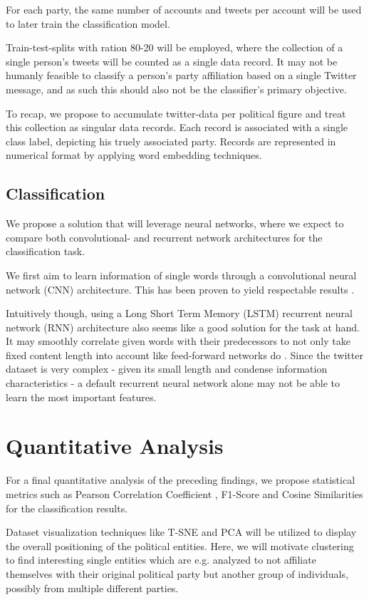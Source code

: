 \documentclass[10pt, oneside]{article}
\begin{document}
\begin{multicols}{2}
For each party, the same number of accounts and tweets per account will be used to later train the classification model.

Train-test-splits with ration 80-20 will be employed, where the collection of a single person's tweets will be counted as a single data record. It may not be humanly feasible to classify a person's party affiliation based on a single Twitter message, and as such this should also not be the classifier's primary objective.

To recap, we propose to accumulate twitter-data per political figure and treat this collection as singular data records. Each record is associated with a single class label, depicting his truely associated party. Records are represented in numerical format by applying word embedding techniques. 

\subsection{Classification}

We propose a solution that will leverage neural networks, where we expect to compare both convolutional- and recurrent network architectures for the classification task.

We first aim to learn information of single words through a convolutional neural network (CNN) architecture. This has been proven to yield respectable results \cite{Kim2014}.

Intuitively though, using a Long Short Term Memory (LSTM) recurrent neural network (RNN) architecture also seems like a good solution for the task at hand. It may smoothly correlate given words with their predecessors to not only take fixed content length into account like feed-forward networks do \cite{Sundermeyer2012lstm}.
Since the twitter dataset is very complex - given its small length and condense information characteristics - a default recurrent neural network alone may not be able to learn the most important features.


\section{Quantitative Analysis}

For a final quantitative analysis of the preceding findings, we propose statistical metrics such as Pearson Correlation Coefficient \cite{Hauke2011}, F1-Score and Cosine Similarities for the classification results.

Dataset visualization techniques like T-SNE \cite{Laurens2008} and PCA \cite{Richardson2009} will be utilized to display the overall positioning of the political entities.
Here, we will motivate clustering to find interesting single entities which are e.g. analyzed to not affiliate themselves with their original political party but another group of individuals, possibly from multiple different parties.


\end{multicols}
\end{document}
